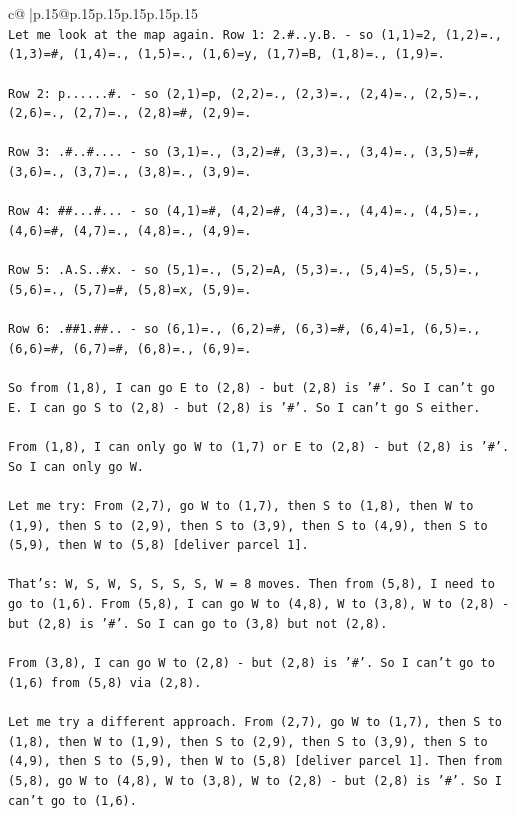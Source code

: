 \documentclass{article}
\begin{document}
{\begin{supertabular}{c@{$\;$}|p{.15\linewidth}@{}p{.15\linewidth}p{.15\linewidth}p{.15\linewidth}p{.15\linewidth}p{.15\linewidth}}
{{{\\ 
\texttt{Let me look at the map again. Row 1: 2.\#..y.B. {-} so (1,1)=2, (1,2)=., (1,3)=\#, (1,4)=., (1,5)=., (1,6)=y, (1,7)=B, (1,8)=., (1,9)=.} \\
\\ 
\texttt{Row 2: p......\#. {-} so (2,1)=p, (2,2)=., (2,3)=., (2,4)=., (2,5)=., (2,6)=., (2,7)=., (2,8)=\#, (2,9)=.} \\
\\ 
\texttt{Row 3: .\#..\#.... {-} so (3,1)=., (3,2)=\#, (3,3)=., (3,4)=., (3,5)=\#, (3,6)=., (3,7)=., (3,8)=., (3,9)=.} \\
\\ 
\texttt{Row 4: \#\#...\#... {-} so (4,1)=\#, (4,2)=\#, (4,3)=., (4,4)=., (4,5)=., (4,6)=\#, (4,7)=., (4,8)=., (4,9)=.} \\
\\ 
\texttt{Row 5: .A.S..\#x. {-} so (5,1)=., (5,2)=A, (5,3)=., (5,4)=S, (5,5)=., (5,6)=., (5,7)=\#, (5,8)=x, (5,9)=.} \\
\\ 
\texttt{Row 6: .\#\#1.\#\#.. {-} so (6,1)=., (6,2)=\#, (6,3)=\#, (6,4)=1, (6,5)=., (6,6)=\#, (6,7)=\#, (6,8)=., (6,9)=.} \\
\\ 
\texttt{So from (1,8), I can go E to (2,8) {-} but (2,8) is '\#'. So I can't go E. I can go S to (2,8) {-} but (2,8) is '\#'. So I can't go S either.} \\
\\ 
\texttt{From (1,8), I can only go W to (1,7) or E to (2,8) {-} but (2,8) is '\#'. So I can only go W.} \\
\\ 
\texttt{Let me try: From (2,7), go W to (1,7), then S to (1,8), then W to (1,9), then S to (2,9), then S to (3,9), then S to (4,9), then S to (5,9), then W to (5,8) {[}deliver parcel 1{]}.} \\
\\ 
\texttt{That's: W, S, W, S, S, S, S, W = 8 moves. Then from (5,8), I need to go to (1,6). From (5,8), I can go W to (4,8), W to (3,8), W to (2,8) {-} but (2,8) is '\#'. So I can go to (3,8) but not (2,8).} \\
\\ 
\texttt{From (3,8), I can go W to (2,8) {-} but (2,8) is '\#'. So I can't go to (1,6) from (5,8) via (2,8).} \\
\\ 
\texttt{Let me try a different approach. From (2,7), go W to (1,7), then S to (1,8), then W to (1,9), then S to (2,9), then S to (3,9), then S to (4,9), then S to (5,9), then W to (5,8) {[}deliver parcel 1{]}. Then from (5,8), go W to (4,8), W to (3,8), W to (2,8) {-} but (2,8) is '\#'. So I can't go to (1,6).} \\
}}}
\end{supertabular}}
\end{document}
